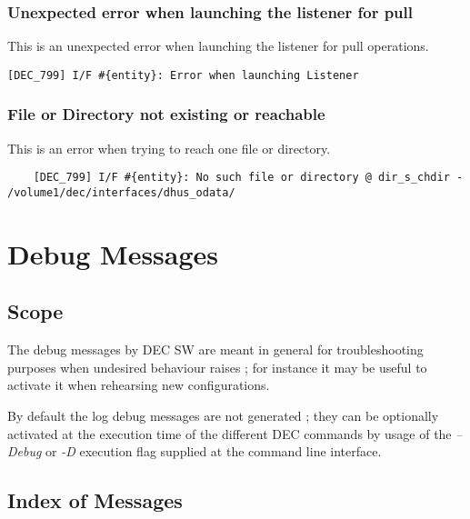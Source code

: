 \documentclass[dec_sum_main.tex]{subfiles}
\begin{document}
\subsubsection{Unexpected error when launching the listener for pull}
This is an unexpected error when launching the listener for pull operations.
\begin{verbatim}
[DEC_799] I/F #{entity}: Error when launching Listener
\end{verbatim}

\subsubsection{File or Directory  not existing or reachable}
This is an error when trying to reach one file or directory.
\begin{verbatim}
	[DEC_799] I/F #{entity}: No such file or directory @ dir_s_chdir - /volume1/dec/interfaces/dhus_odata/
\end{verbatim}



\newpage
\section{Debug Messages}

\subsection{Scope}
The debug messages by DEC SW are meant in general for troubleshooting purposes when undesired behaviour raises ; for instance it may be useful to activate it when rehearsing new configurations. \newline

\par
\noindent
By default the log debug messages are not generated ; they can be optionally activated at the execution time of the different DEC commands by usage of the \textit{--Debug} or \textit{-D} execution flag supplied at the command line interface.


\subsection{Index of Messages}
\end{document}
